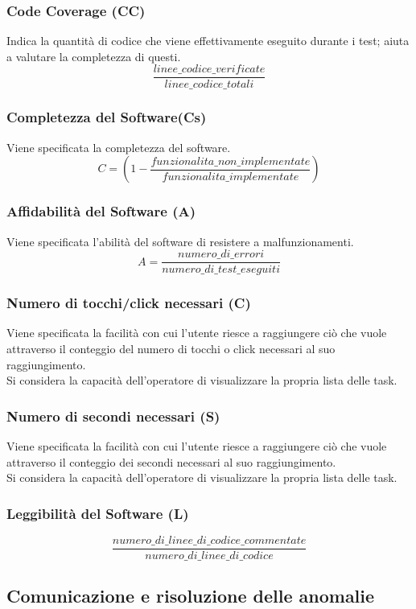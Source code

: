 \subsubsection{Code Coverage (CC)}
Indica la quantità di codice che viene effettivamente eseguito durante i test; aiuta a valutare la completezza di questi.
\[\frac{linee\_codice\_verificate}{linee\_codice\_totali}\]

\subsubsection{Completezza del Software(Cs)}
Viene specificata la completezza del software.
\[C = (1- \frac{funzionalita\_non\_implementate }{funzionalita\_implementate})\]

\subsubsection{Affidabilità del Software (A)}
Viene specificata l'abilità del software di resistere a malfunzionamenti.
\[A = \frac{numero\_di\_errori}{numero\_di\_test\_eseguiti}\]

\subsubsection{Numero di tocchi/click necessari (C)}
Viene specificata la facilità con cui l'utente riesce a raggiungere ciò che vuole attraverso il conteggio del numero di tocchi o click necessari al suo raggiungimento.\\
Si considera la capacità dell'operatore di visualizzare la propria lista delle task.

\subsubsection{Numero di secondi necessari (S)}
Viene specificata la facilità con cui l'utente riesce a raggiungere ciò che vuole attraverso il conteggio dei secondi necessari al suo raggiungimento.\\
Si considera la capacità dell'operatore di visualizzare la propria lista delle task.

\subsubsection{Leggibilità del Software (L)}
\[\frac{numero\_di\_linee\_di\_codice\_commentate}{numero\_di\_linee\_di\_codice}\]

\subsection{Comunicazione e risoluzione delle anomalie}

